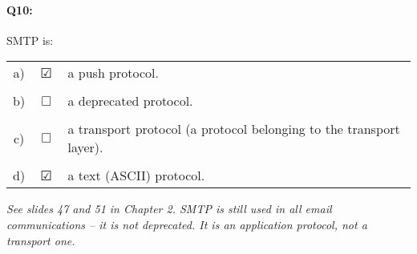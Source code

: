 \documentclass{llncs}
\newcommand{\answer}[1]{{\color{red}\textit{#1}\color{black}}}
\begin{document}
\paragraph{\textbf{Q10:}} SMTP is:\\

\begin{tabular}{ccl}
  a) & $\CheckedBox$ & a push protocol.\\
  \\
  b) & $\Box$ & a deprecated protocol.\\
  \\
  c) & $\Box$ & a transport protocol (a protocol belonging to the transport layer).\\
  \\
  d) & $\CheckedBox$ & a text (ASCII) protocol.\\
\end{tabular}

\answer{See slides 47 and 51 in Chapter 2. SMTP is still used in all
  email communications -- it is not deprecated. It is an application
  protocol, not a transport one.}
\end{document}
